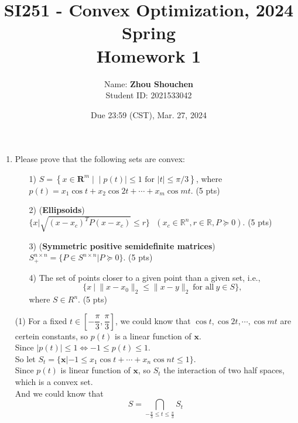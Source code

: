\documentclass[10pt]{article}
\renewcommand{\mathbf}{\boldsymbol}
\begin{document}
\title{	SI251 - Convex Optimization, 2024 Spring\\Homework 1}
\date{Due 23:59 (CST), Mar. 27, 2024 }

\author{
    Name: \textbf{Zhou Shouchen} \\
	Student ID: 2021533042
}

\maketitle

\newpage


\begin{enumerate}

\section{Convex sets}
\item  Please prove that the following sets are convex: 
\begin{itemize}
    \item[1)] $S=\left\{x \in \mathbf{R}^m \;|\;\mid p(t) \mid \leq 1 \text { for }|t| \leq \pi / 3\right\}$, where $p(t)=x_1 \cos t+x_2 \cos 2 t+\cdots+x_m \cos m t$. {\color{red} (5 pts)}
    \item[2)] (\textbf{Ellipsoids}) $\Big\{x|\sqrt{(x-x_c)^TP(x-x_c)}\leq r\Big\}~~~(x_c\in \mathbb{R}^n, r\in \mathbb{R}, P\succeq 0)$. {\color{red} (5 pts)}
    \item[3)] (\textbf{Symmetric positive semidefinite matrices}) $S_{+}^{n\times n}=\Big\{ P\in S^{n\times n}|P\succeq 0\Big\}$. {\color{red} (5 pts)}
    \item[4)] The set of points closer to a given point than a given set, i.e.,
    \begin{equation*}
        \Big\{x~\vert~\|x-x_0\|_2\leq\|x-y\|_2~\text{for all}~y\in S\Big\},
    \end{equation*}
    where $S\in R^n$. {\color{red} (5 pts)}
\end{itemize}

(1) For a fixed $t\in [-\dfrac{\pi}{3},\dfrac{\pi}{3}]$, we could know that $\cos t, \cos 2t,\cdots,\cos mt$ are certein constants, so $p(t)$ is a linear function of $\mathbf{x}$.\\
Since $|p(t)|\leq 1 \Leftrightarrow -1\leq p(t)\leq 1$.\\
So let $S_t=\{\mathbf{x}|-1\leq x_1\cos t+\cdots+x_n\cos nt \leq 1\}$.\\
Since $p(t)$ is linear function of $\mathbf{x}$, so $S_t$ the interaction of two half spaces, which is a convex set.\\
And we could know that 
$$S=\bigcap_{-\frac{\pi}{3}\leq t\leq\frac{\pi}{3}}S_t$$


\end{enumerate}
\end{document}
